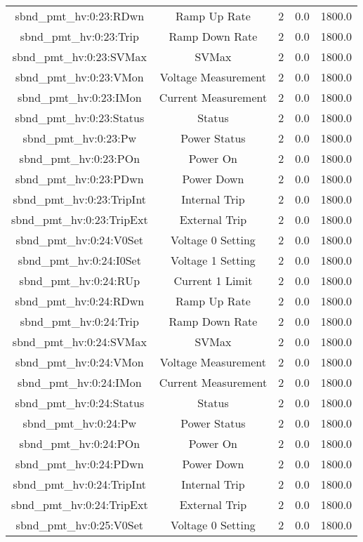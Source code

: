 \begin{table}[ptb]
\begin{tabular}{c | c c c c}
sbnd_pmt_hv:0:23:RDwn & Ramp Up Rate & 2 & 0.0 & 1800.0\\ 
sbnd_pmt_hv:0:23:Trip & Ramp Down Rate & 2 & 0.0 & 1800.0\\ 
sbnd_pmt_hv:0:23:SVMax & SVMax & 2 & 0.0 & 1800.0\\ 
sbnd_pmt_hv:0:23:VMon & Voltage Measurement & 2 & 0.0 & 1800.0\\ 
sbnd_pmt_hv:0:23:IMon & Current Measurement & 2 & 0.0 & 1800.0\\ 
sbnd_pmt_hv:0:23:Status & Status & 2 & 0.0 & 1800.0\\ 
sbnd_pmt_hv:0:23:Pw & Power Status & 2 & 0.0 & 1800.0\\ 
sbnd_pmt_hv:0:23:POn & Power On & 2 & 0.0 & 1800.0\\ 
sbnd_pmt_hv:0:23:PDwn & Power Down & 2 & 0.0 & 1800.0\\ 
sbnd_pmt_hv:0:23:TripInt & Internal Trip & 2 & 0.0 & 1800.0\\ 
sbnd_pmt_hv:0:23:TripExt & External Trip & 2 & 0.0 & 1800.0\\ 
sbnd_pmt_hv:0:24:V0Set & Voltage 0 Setting & 2 & 0.0 & 1800.0\\ 
sbnd_pmt_hv:0:24:I0Set & Voltage 1 Setting & 2 & 0.0 & 1800.0\\ 
sbnd_pmt_hv:0:24:RUp & Current 1 Limit & 2 & 0.0 & 1800.0\\ 
sbnd_pmt_hv:0:24:RDwn & Ramp Up Rate & 2 & 0.0 & 1800.0\\ 
sbnd_pmt_hv:0:24:Trip & Ramp Down Rate & 2 & 0.0 & 1800.0\\ 
sbnd_pmt_hv:0:24:SVMax & SVMax & 2 & 0.0 & 1800.0\\ 
sbnd_pmt_hv:0:24:VMon & Voltage Measurement & 2 & 0.0 & 1800.0\\ 
sbnd_pmt_hv:0:24:IMon & Current Measurement & 2 & 0.0 & 1800.0\\ 
sbnd_pmt_hv:0:24:Status & Status & 2 & 0.0 & 1800.0\\ 
sbnd_pmt_hv:0:24:Pw & Power Status & 2 & 0.0 & 1800.0\\ 
sbnd_pmt_hv:0:24:POn & Power On & 2 & 0.0 & 1800.0\\ 
sbnd_pmt_hv:0:24:PDwn & Power Down & 2 & 0.0 & 1800.0\\ 
sbnd_pmt_hv:0:24:TripInt & Internal Trip & 2 & 0.0 & 1800.0\\ 
sbnd_pmt_hv:0:24:TripExt & External Trip & 2 & 0.0 & 1800.0\\ 
sbnd_pmt_hv:0:25:V0Set & Voltage 0 Setting & 2 & 0.0 & 1800.0\\ 

\end{tabular}
\end{table}

